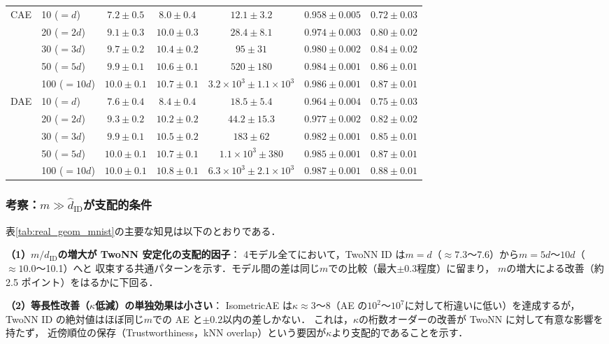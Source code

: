 \documentclass[11pt,a4paper]{jsarticle}
\newcommand{\kap}{\kappa}
\begin{document}
\begin{table}[H]
\begin{tabular}{llccccc}
\midrule
\multirow{5}{*}{CAE}
 & 10 ($=d$)    & $7.2\pm0.5$ & $8.0\pm0.4$ & $12.1\pm3.2$ & $0.958\pm0.005$ & $0.72\pm0.03$ \\
 & 20 ($=2d$)   & $9.1\pm0.3$ & $10.0\pm0.3$ & $28.4\pm8.1$ & $0.974\pm0.003$ & $0.80\pm0.02$ \\
 & 30 ($=3d$)   & $9.7\pm0.2$ & $10.4\pm0.2$ & $95\pm31$  & $0.980\pm0.002$ & $0.84\pm0.02$ \\
 & 50 ($=5d$)   & $9.9\pm0.1$ & $10.6\pm0.1$ & $520\pm180$ & $0.984\pm0.001$ & $0.86\pm0.01$ \\
 & 100 ($=10d$) & $10.0\pm0.1$ & $10.7\pm0.1$ & $3.2\times10^3\pm 1.1\times10^3$ & $0.986\pm0.001$ & $0.87\pm0.01$ \\
\midrule
\multirow{5}{*}{DAE}
 & 10 ($=d$)    & $7.6\pm0.4$ & $8.4\pm0.4$ & $18.5\pm5.4$ & $0.964\pm0.004$ & $0.75\pm0.03$ \\
 & 20 ($=2d$)   & $9.3\pm0.2$ & $10.2\pm0.2$ & $44.2\pm15.3$ & $0.977\pm0.002$ & $0.82\pm0.02$ \\
 & 30 ($=3d$)   & $9.9\pm0.1$ & $10.5\pm0.2$ & $183\pm62$ & $0.982\pm0.001$ & $0.85\pm0.01$ \\
 & 50 ($=5d$)   & $10.0\pm0.1$ & $10.7\pm0.1$ & $1.1\times10^3\pm 380$ & $0.985\pm0.001$ & $0.87\pm0.01$ \\
 & 100 ($=10d$) & $10.0\pm0.1$ & $10.8\pm0.1$ & $6.3\times10^3\pm 2.1\times10^3$ & $0.987\pm0.001$ & $0.88\pm0.01$ \\
\bottomrule
\end{tabular}
\end{table}

\subsubsection*{考察：$m \gg \hat{d}_\mathrm{ID}$が支配的条件}

表\ref{tab:real_geom_mnist}の主要な知見は以下のとおりである．

\textbf{（1）$m/\hat{d}_\mathrm{ID}$の増大が TwoNN 安定化の支配的因子}：
4モデル全てにおいて，TwoNN ID は$m=d$（$\approx 7.3$〜7.6）から$m=5d$〜$10d$（$\approx 10.0$〜10.1）へと
収束する共通パターンを示す．モデル間の差は同じ$m$での比較（最大$\pm0.3$程度）に留まり，
$m$の増大による改善（約 2.5 ポイント）をはるかに下回る．

\textbf{（2）等長性改善（$\kap$低減）の単独効果は小さい}：
IsometricAE は$\kap \approx 3$〜8（AE の$10^2$〜$10^7$に対して桁違いに低い）を達成するが，
TwoNN ID の絶対値はほぼ同じ$m$での AE と$\pm 0.2$以内の差しかない．
これは，$\kap$の桁数オーダーの改善が TwoNN に対して有意な影響を持たず，
近傍順位の保存（Trustworthiness，kNN overlap）という要因が$\kap$より支配的であることを示す．
\end{document}
